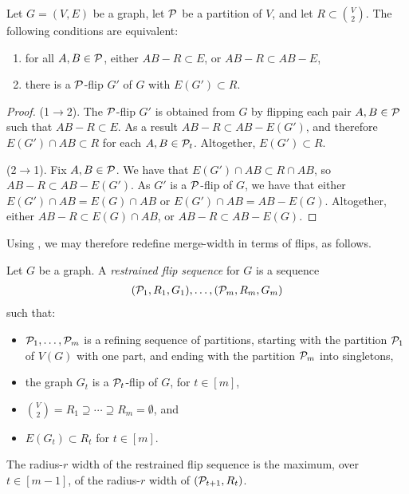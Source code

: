 \begin{lemma}\label{lem:flip}
    Let $G=(V,E)$ be a graph, let $\cal P$ be a partition of $V$, and let $R\subset {V\choose 2}$.
    The following conditions are equivalent:
    \begin{enumerate}
        \item for all $A,B\in\cal P$, either $AB-R\subset E$, or $AB-R\subset AB - E$,
        \item  there is a $\cal P$-flip $G'$ of $G$ with $E(G')\subset R$.
    \end{enumerate}
    \end{lemma}
    \begin{proof}
        (1$\rightarrow$2).
        The $\cal P$-flip $G'$
        is obtained from $G$ by flipping each pair $A,B\in\cal P$ such that $AB-R\subset E$. As a result $AB-R\subset AB-E(G')$, 
        and therefore $E(G')\cap AB\subset R$ for each $A,B\in\cal P_t$.
        Altogether, $E(G')\subset R$.
    
        (2$\rightarrow$1). Fix $A,B\in\cal P$. We have that
        $E(G')\cap AB\subset R\cap AB$,
        so $AB-R\subset AB-E(G')$.
        As $G'$ is a $\cal P$-flip of $G$,
        we have that either $E(G')\cap AB=E(G)\cap AB$ or $E(G')\cap AB=AB-E(G)$.
        Altogether, either $AB-R\subset E(G)\cap AB$, or  $AB-R\subset AB-E(G)$.
    \end{proof}
    
Using , we may therefore redefine merge-width in terms of flips, as follows.




\begin{definition}Let $G$ be a graph.
A \emph{restrained flip sequence} for $G$ is a sequence
\begin{align}\label{eq:mono-fw}
    (\cal P_1,R_1,G_1),\ldots,(\cal P_m,R_m,G_m)    
\end{align}
such that:
\begin{itemize}
    \item $\cal P_1,\ldots,\cal P_m$ is a refining sequence of partitions, starting with the  partition $\cal P_1$ of $V(G)$ with one part, and ending with the partition $\cal P_m$ into singletons,
    \item the graph $G_t$ is a $\cal P_{t}$-flip of $G$, for $t\in [m]$,
    \item ${V\choose 2}= R_1\supseteq \cdots \supseteq R_m=\emptyset$, and
    \item  $E(G_t)\subset R_t$ for $t\in[m]$.
\end{itemize}
The radius-$r$ width of the restrained flip sequence is 
the maximum, over $t\in[m-1]$,
of the radius-$r$ width of $(\cal P_{t+1},R_{t})$.
\end{definition}

